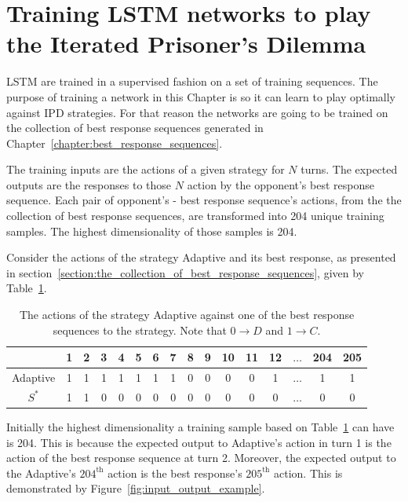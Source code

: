 \section{Training LSTM networks to play the Iterated Prisoner's Dilemma}\label{section:training_a_rnn}

LSTM are trained in a supervised fashion on a set of training sequences. The
purpose of training a network in this Chapter is so it can learn to play
optimally against IPD strategies. For that reason the networks are going to be
trained on the collection of best response sequences generated in
Chapter~\ref{chapter:best_response_sequences}.

The training inputs are the actions of a given strategy for \(N\) turns. The
expected outputs are the responses to those \(N\) action by the opponent's best
response sequence. Each pair of opponent's - best response sequence's actions,
from the the collection of best response sequences, are transformed into 204
unique training samples. The highest dimensionality of those samples is 204.

Consider the actions of the strategy Adaptive and its best response, as
presented in section~\ref{section:the_collection_of_best_response_sequences},
given by Table~\ref{table:adaptive_vs_best_response_binary_lstm}.

\begin{table}[htbp]
    \centering
    \begin{tabular}{cccccccccccccccc}
        & \textbf{1} & \textbf{2} & \textbf{3} & \textbf{4}  & \textbf{5} & \textbf{6} & \textbf{7} & \textbf{8} & \textbf{9} & \textbf{10} & \textbf{11} &  \textbf{12} & \(\dots\)  & \textbf{204} &  \textbf{205} \\ 
        \midrule
        Adaptive & 1 & 1 & 1 & 1 & 1 & 1 & 1 & 0 & 0 & 0 & 0& 1& \(\dots\) & 1 & 1 \\
        \(S^*\) & 1 & 1 & 0 & 0 & 0 & 0 & 0 & 0 & 0 & 0 & 0 & 0& \(\dots\) & 0 & 0 \\ \bottomrule
    \end{tabular}
    \caption{The actions of the strategy Adaptive against one of the best response sequences
    to the strategy. Note that \(0 \to D\) and \(1 \to C\).}\label{table:adaptive_vs_best_response_binary_lstm}
\end{table}

Initially the highest dimensionality a training sample based on
Table~\ref{table:adaptive_vs_best_response_binary_lstm} can have is 204.
This is because the expected output to Adaptive's action in turn 1 is
the action of the best response sequence at turn 2. Moreover, the expected
output to the Adaptive's \(204^{\text{th}}\) action is the best response's
\(205^{\text{th}}\) action. This is demonstrated by
Figure~\ref{fig:input_output_example}.

